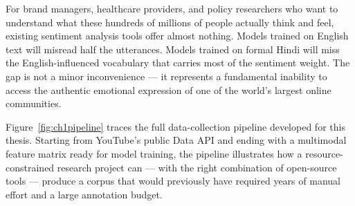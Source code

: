 For brand managers, healthcare providers, and policy researchers who want to understand what these hundreds of millions of people actually think and feel, existing sentiment analysis tools offer almost nothing. Models trained on English text will misread half the utterances. Models trained on formal Hindi will miss the English-influenced vocabulary that carries most of the sentiment weight. The gap is not a minor inconvenience --- it represents a fundamental inability to access the authentic emotional expression of one of the world's largest online communities.

Figure~\ref{fig:ch1pipeline} traces the full data-collection pipeline developed for this thesis. Starting from YouTube's public Data API and ending with a multimodal feature matrix ready for model training, the pipeline illustrates how a resource-constrained research project can --- with the right combination of open-source tools --- produce a corpus that would previously have required years of manual effort and a large annotation budget.

